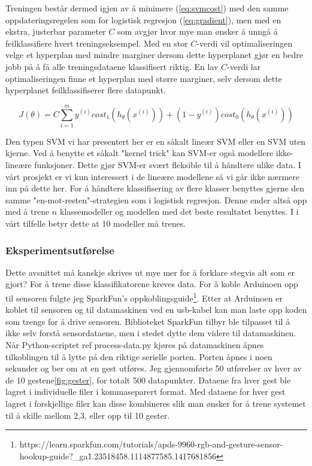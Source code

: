 Treningen består dermed igjen av å minimere (\ref{eq:svmcost}) med den samme oppdateringsregelen som for logistisk regresjon (\ref{eq:gradient}), men med en ekstra, justerbar parameter $C$ som avgjør hvor mye man ønsker å unngå å feilklassifiere hvert treningseksempel. Med en stor $C$-verdi vil optimaliseringen velge et hyperplan med mindre marginer dersom dette hyperplanet gjør en bedre jobb på å få alle treningsdataene klassifisert riktig. En lav $C$-verdi lar optimaliseringen finne et hyperplan med større marginer, selv dersom dette hyperplanet feilklassifiserer flere datapunkt.

\begin{equation}
J(\theta) = 
    C \sum_{i=1}^{m} y^{(i)}cost_1(h_\theta(x^{(i)})) + (1-y^{(i)})cost_0(h_\theta(x^{(i)}))
\label{eq:svmcost}
\end{equation}

Den typen SVM vi har presentert her er en såkalt lineær SVM eller en SVM uten kjerne. Ved å benytte et såkalt "kernel trick" kan SVM-er også modellere ikke-lineære funksjoner. Dette gjør SVM-er svært fleksible til å håndtere ulike data. I vårt prosjekt er vi kun interessert i de lineære modellene så vi går ikke nærmere inn på dette her. For å håndtere klassifisering av flere klasser benyttes gjerne den samme "en-mot-resten"-strategien som i logistisk regresjon. Denne ender altså opp med å trene $n$ klassemodeller og modellen med det beste resultatet benyttes. I i vårt tilfelle betyr dette at 10 modeller må trenes.

\subsubsection*{Eksperimentsutførelse}
{\color{red}Dette avsnittet må kanskje skrives ut mye mer for å forklare stegvis alt som er gjort?}
For å trene disse klassifikatorene kreves data. For å koble Arduinoen opp til sensoren fulgte jeg SparkFun's oppkoblingsguide\footnote{https://learn.sparkfun.com/tutorials/apds-9960-rgb-and-gesture-sensor-hookup-guide?\_ga\=1.23518458.1114877585.1417681856}. Etter at Arduinoen er koblet til sensoren og til datamaskinen ved en usb-kabel kan man laste opp koden som trengs for å drive sensoren. Biblioteket SparkFun tilbyr ble tilpasset til å ikke selv forstå sensordataene, men i stedet dytte dem videre til datamaskinen. Når Python-scriptet{\color{red} ref process-data.py} kjøres på datamaskinen åpnes tilkoblingen til å lytte på den riktige serielle porten. Porten åpnes i noen sekunder og ber om at en gest utføres. Jeg gjennomførte 50 utførelser av hver av de 10 gestene\ref{fig:gester}, for totalt 500 datapunkter. Dataene fra hver gest ble lagret i individuelle filer i kommaseparert format. Med dataene for hver gest lagret i forskjellige filer kan disse kombineres slik man ønsker for å trene systemet til å skille mellom 2,3, eller opp til 10 gester. 

